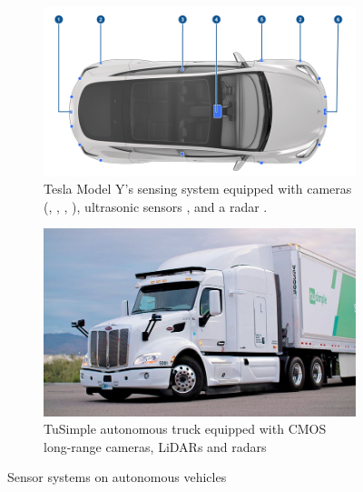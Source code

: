 \begin{figure}[ht] 
    \centering 

    \begin{subfigure}[b]{0.49\textwidth} 
        \includegraphics[width=\textwidth]{figures/tesla.png} 
        \caption{
        Tesla Model Y's sensing system
        equipped with cameras (, 
        , 
        , ),
        ultrasonic sensors , and a radar .
        }
        \label{fig:intro-tesla} 
    \end{subfigure} \hfill
    \begin{subfigure}[b]{0.4\textwidth} 
        \includegraphics[width=\textwidth]{figures/tusimple.jpg} 
        \caption{TuSimple autonomous truck equipped with CMOS long-range cameras, 
        LiDARs and radars} 
        \label{fig:intro-truckcam} 
    \end{subfigure} 
    \caption{Sensor systems on autonomous vehicles}
    \label{fig:intro-autonomous-vehicles}
\end{figure} 

